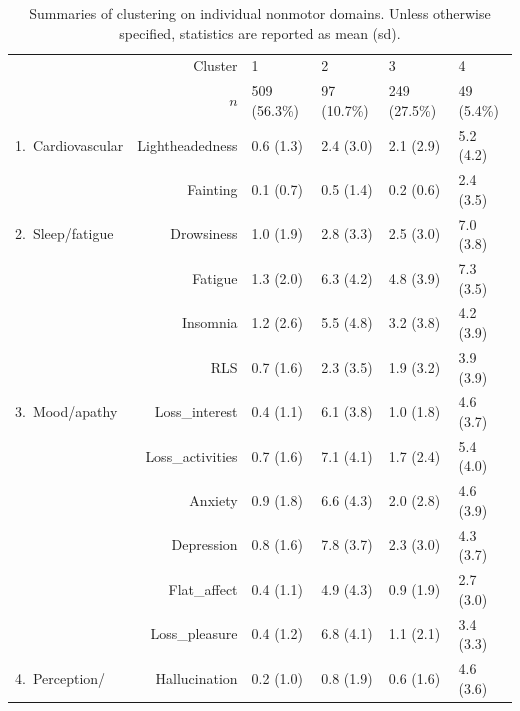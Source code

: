 \documentclass[preprint,5p]{elsarticle} %
\begin{document}
\begin{table}[t]
  \centering
  \caption{Summaries of clustering on individual nonmotor domains. Unless otherwise specified,
  statistics are reported as mean (sd).}
  \label{tab:nms30}
  \begin{threeparttable}
  \small
\begin{tabular}{lrllll}
  \toprule
    & Cluster & 1 & 2 & 3 & 4 \\
    & $n$ & 509 (56.3\%) & 97 (10.7\%) & 249 (27.5\%) & 49 (5.4\%) \\
  \midrule
  1.\ Cardiovascular &
  Lightheadedness & 0.6 (1.3)\tnote{234} & 2.4 (3.0)\tnote{14} & 2.1 (2.9)\tnote{14} & 5.2
  (4.2)\tnote{123} \\
  &Fainting & 0.1 (0.7)\tnote{24} & 0.5 (1.4)\tnote{134} & 0.2 (0.6)\tnote{24} & 2.4
  (3.5)\tnote{123} \\
  \midrule
  2.\ Sleep/fatigue &
  Drowsiness & 1.0 (1.9)\tnote{234} & 2.8 (3.3)\tnote{14} & 2.5 (3.0)\tnote{14} & 7.0
  (3.8)\tnote{123} \\
  &Fatigue & 1.3 (2.0)\tnote{234} & 6.3 (4.2)\tnote{13} & 4.8 (3.9)\tnote{124} & 7.3 (3.5)\tnote{13} \\
  &Insomnia & 1.2 (2.6)\tnote{234} & 5.5 (4.8)\tnote{13} & 3.2 (3.8)\tnote{12} & 4.2
  (3.9)\tnote{1} \\
  &RLS & 0.7 (1.6)\tnote{234} & 2.3 (3.5)\tnote{14} & 1.9 (3.2)\tnote{14} & 3.9
  (3.9)\tnote{123} \\
  \midrule
  3.\ Mood/apathy &
  Loss\_interest & 0.4 (1.1)\tnote{234} & 6.1 (3.8)\tnote{134} & 1.0 (1.8)\tnote{124} & 4.6 (3.7)\tnote{123} \\
  &Loss\_activities & 0.7 (1.6)\tnote{234} & 7.1 (4.1)\tnote{134} & 1.7 (2.4)\tnote{124} &
  5.4 (4.0)\tnote{123} \\
  &Anxiety & 0.9 (1.8)\tnote{234} & 6.6 (4.3)\tnote{134} & 2.0 (2.8)\tnote{124} & 4.6 (3.9)\tnote{123} \\
  &Depression & 0.8 (1.6)\tnote{234} & 7.8 (3.7)\tnote{134} & 2.3 (3.0)\tnote{124} & 4.3 (3.7)\tnote{123} \\
  &Flat\_affect & 0.4 (1.1)\tnote{234} & 4.9 (4.3)\tnote{134} & 0.9 (1.9)\tnote{124} & 2.7 (3.0)\tnote{123} \\
  &Loss\_pleasure & 0.4 (1.2)\tnote{234} & 6.8 (4.1)\tnote{134} & 1.1 (2.1)\tnote{124} & 3.4 (3.3)\tnote{123} \\
  \midrule
  4.\ Perception/ & Hallucination & 0.2 (1.0)\tnote{234} & 0.8 (1.9)\tnote{14} & 0.6 (1.6)\tnote{14} & 4.6 (3.6)\tnote{123} \\

\end{tabular}
\end{threeparttable}
\end{table}
\end{document}
